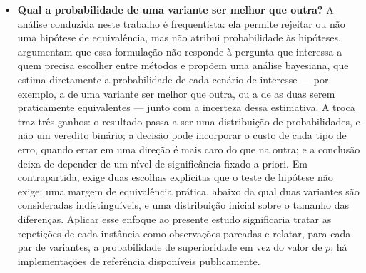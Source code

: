 \begin{itemize}
          Para toda a base TSPLIB95, com até \(2\,103\) cidades, a ocupação fica em torno de um terço desse espaço, e o limite teórico da representação atual é de cerca de \(6\) mil cidades por bloco.
          Uma alternativa é representar a mesma tabela como um mapa de bits, com uma palavra de \(32\) bits para cada grupo de \(32\) cidades; a ocupação cairia para cerca de um oitavo, e o mesmo espaço passaria a comportar cerca de \(49\) mil cidades por bloco.
          O custo da troca é que duas \emph{threads} que marcam cidades do mesmo grupo precisam de uma operação atômica para não sobrescrever a escrita uma da outra.
          A questão de pesquisa é quantificar essa penalidade de sincronização e verificar em que ponto a economia de memória compensa a perda de vazão \autocite{kirk2010programming,nvidia2024cuda}.
    \item
          \textbf{Qual a probabilidade de uma variante ser melhor que outra?} A análise conduzida neste trabalho é frequentista: ela permite rejeitar ou não uma hipótese de equivalência, mas não atribui probabilidade às hipóteses.
          \textcite{benavoli2017time} argumentam que essa formulação não responde à pergunta que interessa a quem precisa escolher entre métodos e propõem uma análise bayesiana, que estima diretamente a probabilidade de cada cenário de interesse --- por exemplo, a de uma variante ser melhor que outra, ou a de as duas serem praticamente equivalentes --- junto com a incerteza dessa estimativa.
          A troca traz três ganhos: o resultado passa a ser uma distribuição de probabilidades, e não um veredito binário; a decisão pode incorporar o custo de cada tipo de erro, quando errar em uma direção é mais caro do que na outra; e a conclusão deixa de depender de um nível de significância fixado a priori.
          Em contrapartida, exige duas escolhas explícitas que o teste de hipótese não exige: uma margem de equivalência prática, abaixo da qual duas variantes são consideradas indistinguíveis, e uma distribuição inicial sobre o tamanho das diferenças.
          Aplicar esse enfoque ao presente estudo significaria tratar as repetições de cada instância como observações pareadas e relatar, para cada par de variantes, a probabilidade de superioridade em vez do valor de \(p\); há implementações de referência disponíveis publicamente.
\end{itemize}

